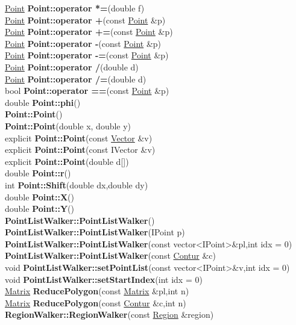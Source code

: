 \documentclass[10pt,titlepage]{article}
\def\functionlistentry#1#2#3#4#5#6{\noindent #1 {\bf #2}(#3) \dotfill #6\\}
\begin{document}
{{\functionlistentry{\hyperlink{Point}{Point}}{Point::operator *=}{double f}{166}{datastructures}{}
\functionlistentry{\hyperlink{Point}{Point}}{Point::operator +}{const \hyperlink{Point}{Point} \&p}{161}{datastructures}{}
\functionlistentry{\hyperlink{Point}{Point}}{Point::operator +=}{const \hyperlink{Point}{Point} \&p}{162}{datastructures}{}
\functionlistentry{\hyperlink{Point}{Point}}{Point::operator -}{const \hyperlink{Point}{Point} \&p}{163}{datastructures}{}
\functionlistentry{\hyperlink{Point}{Point}}{Point::operator -=}{const \hyperlink{Point}{Point} \&p}{164}{datastructures}{}
\functionlistentry{\hyperlink{Point}{Point}}{Point::operator /}{double d}{168}{datastructures}{}
\functionlistentry{\hyperlink{Point}{Point}}{Point::operator /=}{double d}{169}{datastructures}{}
\functionlistentry{bool}{Point::operator ==}{const \hyperlink{Point}{Point} \&p}{159}{datastructures}{}
\functionlistentry{double}{Point::phi}{}{172}{datastructures}{}
\functionlistentry{}{Point::Point}{}{152}{datastructures}{}
\functionlistentry{}{Point::Point}{double x, double y}{153}{datastructures}{}
\functionlistentry{explicit}{Point::Point}{const \hyperlink{Vector}{Vector} \&v}{154}{datastructures}{}
\functionlistentry{explicit}{Point::Point}{const IVector \&v}{155}{datastructures}{}
\functionlistentry{explicit}{Point::Point}{double d[]}{156}{datastructures}{}
\functionlistentry{double}{Point::r}{}{171}{datastructures}{}
\functionlistentry{int}{Point::Shift}{double dx,double dy}{170}{datastructures}{}
\functionlistentry{double}{Point::X}{}{157}{datastructures}{}
\functionlistentry{double}{Point::Y}{}{158}{datastructures}{}
\functionlistentry{}{PointListWalker::PointListWalker}{}{185}{datastructures}{}
\functionlistentry{}{PointListWalker::PointListWalker}{IPoint p}{186}{datastructures}{}
\functionlistentry{}{PointListWalker::PointListWalker}{const vector\textless {}IPoint\textgreater  \&pl,int idx = 0}{187}{datastructures}{}
\functionlistentry{}{PointListWalker::PointListWalker}{const \hyperlink{Contur}{Contur} \&c}{188}{datastructures}{}
\functionlistentry{void}{PointListWalker::setPointList}{const vector\textless {}IPoint\textgreater  \&v,int idx = 0}{189}{datastructures}{}
\functionlistentry{void}{PointListWalker::setStartIndex}{int idx = 0}{190}{datastructures}{}
\functionlistentry{\hyperlink{Matrix}{Matrix}}{ReducePolygon}{const \hyperlink{Matrix}{Matrix} \&pl,int n}{281}{datastructures}{}
\functionlistentry{\hyperlink{Matrix}{Matrix}}{ReducePolygon}{const \hyperlink{Contur}{Contur} \&c,int n}{282}{datastructures}{}
\functionlistentry{}{RegionWalker::RegionWalker}{const \hyperlink{Region}{Region} \&region}{193}{datastructures}{}
}}
\end{document}
